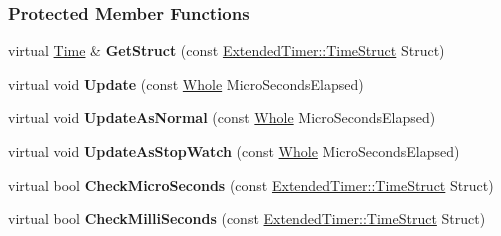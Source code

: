 \subsubsection*{Protected Member Functions}
\begin{DoxyCompactItemize}
\item 
\hypertarget{classphys_1_1ExtendedTimer_a94f3140d4eba930ed76cc530b4f847b7}{
virtual \hyperlink{structphys_1_1Time}{Time} \& {\bfseries GetStruct} (const \hyperlink{classphys_1_1ExtendedTimer_a0f316e9347d1c118a157cc3c737c554b}{ExtendedTimer::TimeStruct} Struct)}
\label{dc/d7c/classphys_1_1ExtendedTimer_a94f3140d4eba930ed76cc530b4f847b7}

\item 
\hypertarget{classphys_1_1ExtendedTimer_ac5e604ad911911939ba190520f8c3399}{
virtual void {\bfseries Update} (const \hyperlink{namespacephys_a460f6bc24c8dd347b05e0366ae34f34a}{Whole} MicroSecondsElapsed)}
\label{dc/d7c/classphys_1_1ExtendedTimer_ac5e604ad911911939ba190520f8c3399}

\item 
\hypertarget{classphys_1_1ExtendedTimer_af790c2d0fdaf009b77b8a351ab95026e}{
virtual void {\bfseries UpdateAsNormal} (const \hyperlink{namespacephys_a460f6bc24c8dd347b05e0366ae34f34a}{Whole} MicroSecondsElapsed)}
\label{dc/d7c/classphys_1_1ExtendedTimer_af790c2d0fdaf009b77b8a351ab95026e}

\item 
\hypertarget{classphys_1_1ExtendedTimer_a2df54619bf6a74d8c44c877352b3f323}{
virtual void {\bfseries UpdateAsStopWatch} (const \hyperlink{namespacephys_a460f6bc24c8dd347b05e0366ae34f34a}{Whole} MicroSecondsElapsed)}
\label{dc/d7c/classphys_1_1ExtendedTimer_a2df54619bf6a74d8c44c877352b3f323}

\item 
\hypertarget{classphys_1_1ExtendedTimer_a4ae8b42ab14c7eb0b667968362eb9fbc}{
virtual bool {\bfseries CheckMicroSeconds} (const \hyperlink{classphys_1_1ExtendedTimer_a0f316e9347d1c118a157cc3c737c554b}{ExtendedTimer::TimeStruct} Struct)}
\label{dc/d7c/classphys_1_1ExtendedTimer_a4ae8b42ab14c7eb0b667968362eb9fbc}

\item 
\hypertarget{classphys_1_1ExtendedTimer_ac70c02c75c9172a16dbd1dd3cdc1c554}{
virtual bool {\bfseries CheckMilliSeconds} (const \hyperlink{classphys_1_1ExtendedTimer_a0f316e9347d1c118a157cc3c737c554b}{ExtendedTimer::TimeStruct} Struct)}
\label{dc/d7c/classphys_1_1ExtendedTimer_ac70c02c75c9172a16dbd1dd3cdc1c554}


\end{DoxyCompactItemize}
